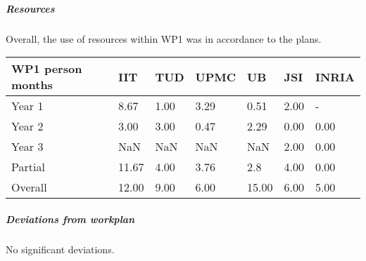 

\subparagraph{Resources}
Overall, the use of resources within WP1 was in accordance to the plans. 

\begin{center}
  \begin{tabular}{|C{1.5cm}|C{1.5cm}|C{1.5cm}|C{2cm}|C{2cm}|C{2cm}|C{2cm}|}
    \hline \footnotesize \textbf{WP1 person months}& \footnotesize
    \textbf{IIT}&\footnotesize \textbf{TUD}&\footnotesize \textbf{UPMC}&
    \footnotesize \textbf{UB} &\footnotesize \textbf{JSI} & \footnotesize \textbf{INRIA}\\
    \hline \footnotesize Year 1 & 8.67 &1.00 & 3.29 & 0.51 & 2.00 & -\\
    \hline \footnotesize Year 2 & 3.00 & 3.00 & 0.47 & 2.29 & 0.00 & 0.00 \\
    \hline \footnotesize Year 3 & NaN & NaN & NaN & NaN & 2.00 & 0.00 \\
    \hline \footnotesize Partial & 11.67 & 4.00 & 3.76 & 2.8 & 4.00 & 0.00\\ \hline
    \hline \footnotesize Overall & 12.00 & 9.00 & 6.00 & 15.00 & 6.00 & 5.00 \\
    \hline
  \end{tabular}
\end{center}

\subparagraph{Deviations from workplan} 
No significant deviations. 

